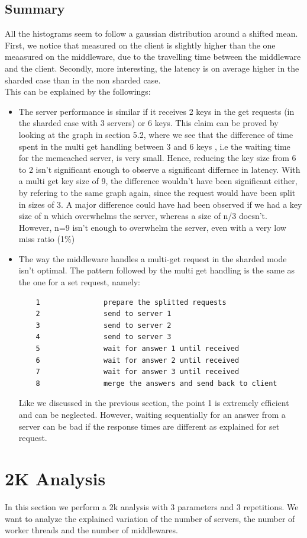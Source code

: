 \documentclass[11pt,a4paper]{article}
\begin{document}
\subsection{Summary}

All the histograms seem to follow a gaussian distribution around a shifted mean. First, we notice that measured on the client is slightly higher than the one meaasured on the middleware, due to the travelling time between the middleware and the client. Secondly, more interesting, the latency is on average higher in the sharded case than in the non sharded case. 
\\
This can be explained by the followings: 
\begin{itemize}
\item The server performance is similar if it receives 2 keys in the get requests (in the sharded case with 3 servers) or 6 keys. This claim can be proved by looking at the graph in section 5.2, where we see that the difference of time spent in the multi get handling between 3 and 6 keys , i.e the waiting time for the memcached server, is very small. Hence, reducing the key size from 6 to 2 isn't significant enough to observe a significant differnce in latency. 
With a multi get key size of 9, the difference wouldn't have been significant either, by refering to the same graph again, since the request would have been split in sizes of 3. A major difference could have had been observed if we had a key size of n which overwhelms the server, whereas a size of n/3 doesn't. However, n=9 isn't enough to overwhelm the server, even with a very low miss ratio (1\%)
\item The way the middleware handles a multi-get request in the sharded mode isn't optimal. The pattern followed by the multi get handling is the same as the one for a set request, namely: 
\begin{lstlisting}
	1				prepare the splitted requests
	2				send to server 1
	3				send to server 2
	4				send to server 3
	5				wait for answer 1 until received
	6				wait for answer 2 until received
	7				wait for answer 3 until received
	8				merge the answers and send back to client
\end{lstlisting}
Like we discussed in the previous section, the point 1 is extremely efficient and can be neglected. However, waiting sequentially for an answer from a server can be bad if the response times are different as explained for set request. 
\end{itemize}  

\newpage
\section{2K Analysis}
In this section we perform a 2k analysis with 3 parameters and 3 repetitions. We want to analyze the explained variation of the number of servers, the number of worker threads and the number of middlewares. 
\end{document}
